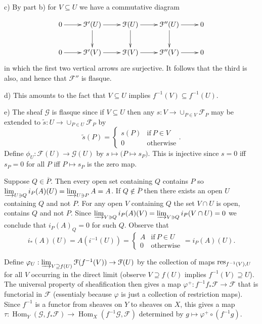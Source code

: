 \documentclass{report}
\newcommand{\F}{\mathcal{F}}
\newcommand{\G}{\mathcal{G}}
\DeclareMathOperator{\Hom}{Hom}
\begin{document}
\noindent
c)	By part b) for $V\subseteq U$ we have a commutative diagram
	
\begin{equation}
\xymatrix{
{0}\ar[r] &{\F'(U)} \ar[r] \ar[d] & {\F(U)} \ar[r] \ar[d] & {\F''(U)}\ar[r]\ar[d] &    {0}\\
{0}\ar[r] &{\F'(V)} \ar[r]  & {\F(V)} \ar[r]  & {\F''(V)}\ar[r] &    {0}
}\nonumber
\end{equation}
in which the first two vertical arrows are surjective.  It follows that the third is also, and hence that
$\F''$ is flasque.

\noindent
d)	This amounts to the fact that $V\subseteq U$ implies $f^{-1}(V)\subseteq f^{-1}(U)$.

\noindent
e)	The sheaf $\G$ is flasque since if $V\subseteq U$ then any $s:V\rightarrow \cup_{P\in V} \F_P$ may be extended
to $\widetilde{s}:U\rightarrow \cup_{P\in U}\F_P$ by
$$\widetilde{s}(P)=\begin{cases}s(P) & \text{if}\ P\in V\\ 0 & \text{otherwise}\end{cases}.$$
Define $\phi_U:\F(U)\rightarrow \G(U)$ by $s\mapsto \big(P\mapsto s_P\big)$.    This is injective
since $s=0$ iff $s_P=0$ for all $P$ iff $P\mapsto s_P$ is the zero map.

\bigskip
{}	Suppose $Q\in \overline{P}$.  Then every open set containing $Q$ contains $P$ so $\varinjlim_{U\ni Q}i_P(A)(U)=\varinjlim_{U\ni P} A=A$.
If $Q\not\in \overline{P}$ then there exists an open $U$ containing $Q$ and not $P$.  For any open $V$ containing $Q$
the set $V\cap U$ is open, contains $Q$ and not $P$.  Since $\varinjlim_{V\ni Q}i_P(A)(V)=\varinjlim_{V\ni Q}i_P(V\cap U)=0$
we conclude that $i_P(A)_Q=0$ for such $Q$.	  Observe that
$$i_*(A)(U)=A(i^{-1}(U))=\begin{cases}A & \text{if}\ P\in U\\ 0 & \text{otherwise}\end{cases}=i_P(A)(U).$$


\bigskip
{}	Define $\varphi_U: \varinjlim_{V\supseteq f(U)}\F(f^{-1}(V))\rightarrow \F(U)$ by the collection of maps
${\rm res}_{f^{-1}(V),U}$ for all $V$ occurring in the direct limit (observe $V\supseteq f(U)$ implies $f^{-1}(V)\supseteq U$).
The universal property of sheafification then gives a map $\varphi^+:f^{-1}f_*\F\rightarrow \F$ that is
functorial in $\F$ (essentialy because $\varphi$ is just a collection of restriction maps).  Since $f^{-1}$ is a functor
from sheaves on $Y$ to sheaves on $X$, this gives a map $\tau:\Hom_Y(\G,f_*\F)\rightarrow \Hom_X(f^{-1}\G,\F)$
determined by $g\mapsto \varphi^+\circ(f^{-1}g)$. 
\end{document}

